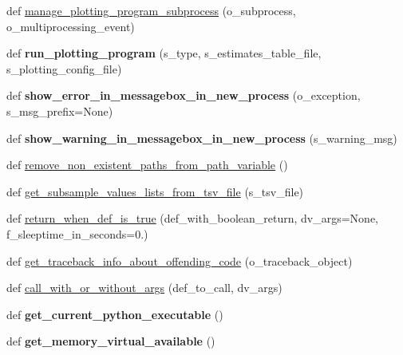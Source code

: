 \begin{DoxyCompactItemize}
\item 
def \hyperlink{namespacenegui_1_1pgutilities_a27835f7b8bcbb2b3969f5bd2dfd08072}{manage\+\_\+plotting\+\_\+program\+\_\+subprocess} (o\+\_\+subprocess, o\+\_\+multiprocessing\+\_\+event)
\item 
def {\bfseries run\+\_\+plotting\+\_\+program} (s\+\_\+type, s\+\_\+estimates\+\_\+table\+\_\+file, s\+\_\+plotting\+\_\+config\+\_\+file)\hypertarget{namespacenegui_1_1pgutilities_a1e7a7774f29fea829d3b29563c8dd643}{}\label{namespacenegui_1_1pgutilities_a1e7a7774f29fea829d3b29563c8dd643}

\item 
def {\bfseries show\+\_\+error\+\_\+in\+\_\+messagebox\+\_\+in\+\_\+new\+\_\+process} (o\+\_\+exception, s\+\_\+msg\+\_\+prefix=None)\hypertarget{namespacenegui_1_1pgutilities_a3f2675bc8eb3aae305ba8cc0c7df8d33}{}\label{namespacenegui_1_1pgutilities_a3f2675bc8eb3aae305ba8cc0c7df8d33}

\item 
def {\bfseries show\+\_\+warning\+\_\+in\+\_\+messagebox\+\_\+in\+\_\+new\+\_\+process} (s\+\_\+warning\+\_\+msg)\hypertarget{namespacenegui_1_1pgutilities_af0f5d52072818d4abaa5f92f5250ef26}{}\label{namespacenegui_1_1pgutilities_af0f5d52072818d4abaa5f92f5250ef26}

\item 
def \hyperlink{namespacenegui_1_1pgutilities_af67695b6ecd6a9c2958780ec78c4ee30}{remove\+\_\+non\+\_\+existent\+\_\+paths\+\_\+from\+\_\+path\+\_\+variable} ()
\item 
def \hyperlink{namespacenegui_1_1pgutilities_aac95b31d10fd9e225c4295f04274bf28}{get\+\_\+subsample\+\_\+values\+\_\+lists\+\_\+from\+\_\+tsv\+\_\+file} (s\+\_\+tsv\+\_\+file)
\item 
def \hyperlink{namespacenegui_1_1pgutilities_a741453431df5aa517c9e2237ad2e6f27}{return\+\_\+when\+\_\+def\+\_\+is\+\_\+true} (def\+\_\+with\+\_\+boolean\+\_\+return, dv\+\_\+args=None, f\+\_\+sleeptime\+\_\+in\+\_\+seconds=0.)
\item 
def \hyperlink{namespacenegui_1_1pgutilities_af7697cf9c85b30c07d7c6fc56df49501}{get\+\_\+traceback\+\_\+info\+\_\+about\+\_\+offending\+\_\+code} (o\+\_\+traceback\+\_\+object)
\item 
def \hyperlink{namespacenegui_1_1pgutilities_a1971ec40e5be1289e22cf28e5da882f9}{call\+\_\+with\+\_\+or\+\_\+without\+\_\+args} (def\+\_\+to\+\_\+call, dv\+\_\+args)
\item 
def {\bfseries get\+\_\+current\+\_\+python\+\_\+executable} ()\hypertarget{namespacenegui_1_1pgutilities_a5c5b5b06df6303decd4f0b7b4ffbf411}{}\label{namespacenegui_1_1pgutilities_a5c5b5b06df6303decd4f0b7b4ffbf411}

\item 
def {\bfseries get\+\_\+memory\+\_\+virtual\+\_\+available} ()\hypertarget{namespacenegui_1_1pgutilities_a4f7d34c11922d8318b536c56920f736d}{}\label{namespacenegui_1_1pgutilities_a4f7d34c11922d8318b536c56920f736d}

\end{DoxyCompactItemize}
